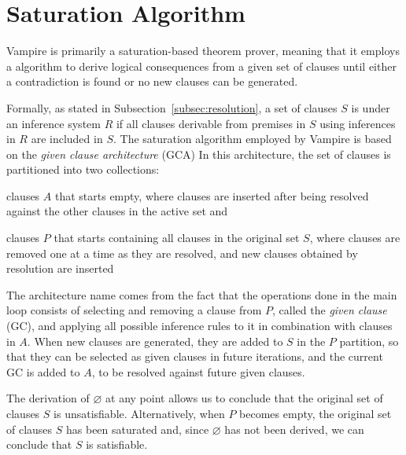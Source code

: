 \section{Saturation Algorithm}\label{sec:saturation-algorithm}

Vampire is primarily a saturation-based theorem prover, meaning that it employs a  algorithm to derive logical consequences from a given set of clauses until either a contradiction is found or no new clauses can be generated.

Formally, as stated in Subsection~\ref{subsec:resolution}, a set of clauses \(S\) is  under an inference system \(R\) if all clauses derivable from premises in \(S\) using inferences in \(R\) are included in \(S\).
The saturation algorithm employed by Vampire is based on the \emph{given clause architecture} (GCA)
In this architecture, the set of clauses is partitioned into two collections:

\begin{enumerate*}[label= (\roman*)]
  \item {} clauses \(A\) that starts empty, where clauses are inserted after being resolved against the other clauses in the active set and
  \item {} clauses \(P\) that starts containing all clauses in the original set \(S\), where clauses are removed one at a time as they are resolved, and new clauses obtained by resolution are inserted
\end{enumerate*}

The architecture name comes from the fact that the operations done in the main loop consists of selecting and removing a clause from \(P\), called the \emph{given clause} (GC), and applying all possible inference rules to it in combination with clauses in \(A\).
When new clauses are generated, they are added to \(S\) in the \(P\) partition, so that they can be selected as given clauses in future iterations, and the current GC is added to \(A\), to be resolved against future given clauses.

The derivation of \(\varnothing\) at any point allows us to conclude that the original set of clauses \(S\) is unsatisfiable.
Alternatively, when \(P\) becomes empty, the original set of clauses \(S\) has been saturated and, since \(\varnothing\) has not been derived, we can conclude that \(S\) is satisfiable.

